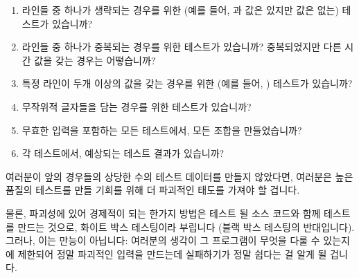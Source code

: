{\begin{enumerate}
	\fi

	\item	라인들 중 하나가 생략되는 경우를 위한 (예를 들어,  과
		 값은 있지만  값은 없는) 테스트가 있습니까?
	\item	라인들 중 하나가 중복되는 경우를 위한 테스트가 있습니까?
		중복되었지만 다른 시간 값을 갖는 경우는 어떻습니까?
	\item	특정 라인이 두개 이상의 값을 갖는 경우를 위한 (예를 들어,
		) 테스트가 있습니까?
	\item	무작위적 글자들을 담는 경우를 위한 테스트가 있습니까?
	\item	무효한 입력을 포함하는 모든 테스트에서, 모든 조합을
		만들었습니까?
	\item	각 테스트에서, 예상되는 테스트 결과가 있습니까?

	\end{enumerate}

	여러분이 앞의 경우들의 상당한 수의 테스트 데이터를 만들지 않았다면,
	여러분은 높은 품질의 테스트를 만들 기회를 위해 더 파괴적인 태도를
	가져야 할 겁니다.

	물론, 파괴성에 있어 경제적이 되는 한가지 방법은 테스트 될 소스 코드와
	함께 테스트를 만드는 것으로, 화이트 박스 테스팅이라 부립니다 (블랙 박스
	테스팅의 반대입니다).
	그러나, 이는 만능이 아닙니다: 여러분의 생각이 그 프로그램이 무엇을 다룰
	수 있는지에 제한되어 정말 파괴적인 입력을 만드는데 실패하기가 정말
	쉽다는 걸 알게 될 겁니다.

}
